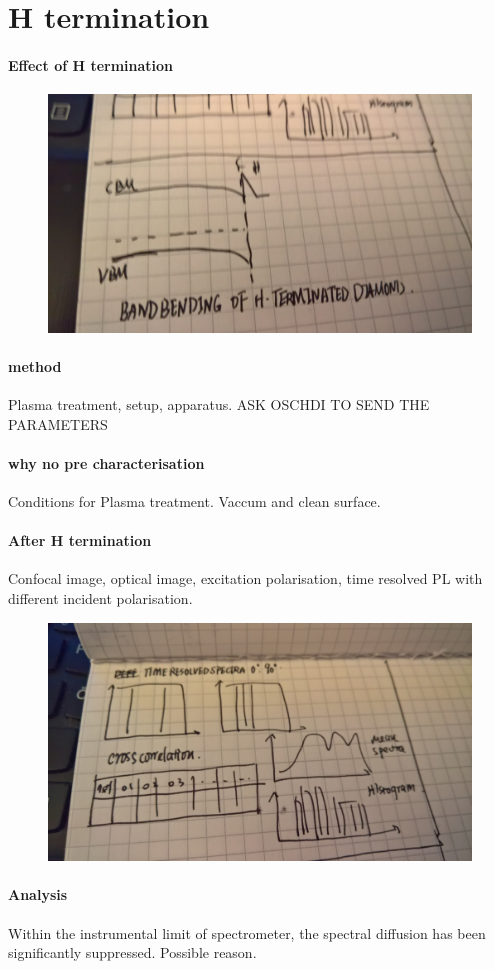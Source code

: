 
\section[H termination]{H termination}
\paragraph{Effect of H termination}

\FloatBarrier
\begin{figure}[h]
\centering
\includegraphics[width=0.7\linewidth]{Figures/pic/WP_20160921_21_05_16_Pro_LI}
\caption{}
\label{fig:wp20160921210516proli}
\end{figure}
\FloatBarrier
\paragraph{method} Plasma treatment, setup, apparatus.
ASK OSCHDI TO SEND THE PARAMETERS

\paragraph{why no pre characterisation} Conditions for Plasma treatment.
Vaccum and clean surface.
\paragraph{After H termination} Confocal image, optical image, excitation polarisation, time resolved PL with different incident polarisation.
\FloatBarrier
\begin{figure}[h]
\centering
\includegraphics[width=0.7\linewidth]{Figures/pic/WP_20160921_21_05_13_Pro_LI}
\caption{}
\label{fig:wp20160921210513proli}
\end{figure}
\FloatBarrier

\paragraph{Analysis} Within the instrumental limit of spectrometer, the spectral diffusion has been significantly suppressed. Possible reason.